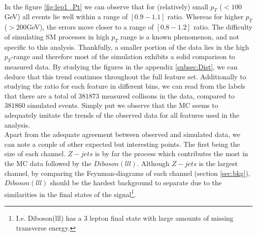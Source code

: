 \\
In the figure \ref{fig:lep1_Pt} we can observe that for (relatively) small $p_T$ ($<100$GeV) all events lie well within a range of $[0.9-1.1]$ ratio. 
Whereas for higher $p_T$ ($>200$GeV), the errors move closer to a range of $[0.8-1.2]$ ratio. The difficulty of simulating \ac{SM} processes 
in high $p_T$ range is a known phenomenon, and not specific to this analysis. Thankfully, a smaller portion of the data lies in the high $p_T$-range
and therefore most of the simulation exhibits a solid comparison to measured data. By studying the figures in the appendix \ref{subsec:Dist}, 
we can deduce that this trend continues throughout the full feature set. Additionally to studying the ratio for each feature in different bins,
we can read from the labels that there are a total of $381873$ measured collisons in the data, compared to $381860$ simulated events.
Simply put we observe that the \ac{MC} seems to adequately imitate the trends of the observed data for all features used in the analysis. 
\\
Apart from the adequate agreement between observed and simulated data, we can note a couple of other expected
but interesting points. The first being the size of each channel. $Z-jets$ is by far the process which contributes the most in the \ac{MC} data
followed by the $Diboson (lll)$. Although $Z-jets$ is the largest channel, by comparing the Feynman-diagrams of each channel
(section \ref{sec:bkg}), $Diboson(lll)$ should be the hardest background to separate due to the similarities in the 
final states of the signal\footnote{I.e. Diboson(lll) has a 3 lepton final state with large amounts of missing transverse energy.}. 
